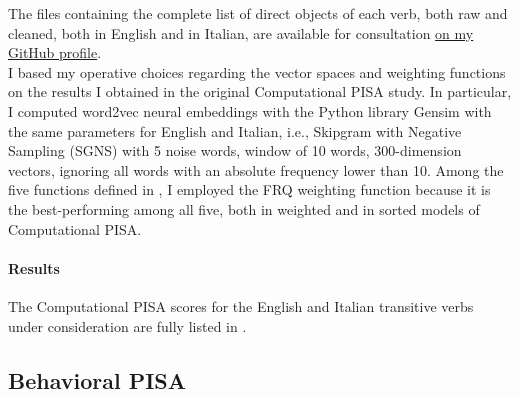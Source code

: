 The files containing the complete list of direct objects of each verb, both raw and cleaned, both in English and in Italian, are available for consultation \href{https://github.com/giuliacappelli/dissertationData}{on my GitHub profile}.\\
I based my operative choices regarding the vector spaces and weighting functions on the results I obtained in the original Computational PISA study. In particular, I computed word2vec neural embeddings with the Python library Gensim with the same parameters for English and Italian, i.e., Skipgram with Negative Sampling (SGNS) with 5 noise words, window of 10 words, 300-dimension vectors, ignoring all words with an absolute frequency lower than 10. Among the five functions defined in \textcite{CappelliLenciPISA}, I employed the FRQ weighting function because it is the best-performing among all five, both in weighted and in sorted models of Computational PISA.

\paragraph{Results}
The Computational PISA scores for the English and Italian transitive verbs under consideration are fully listed in .\\ %


\subsection{Behavioral PISA} 

